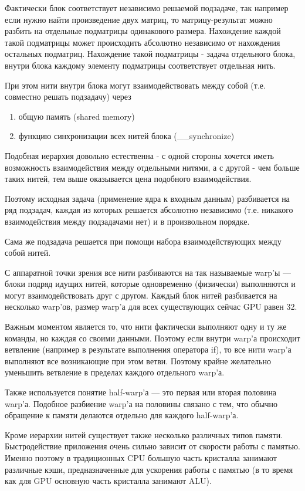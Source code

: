 Фактически блок соответствует независимо решаемой подзадаче, так например если нужно найти произведение двух матриц, то матрицу-результат можно разбить на отдельные подматрицы одинакового размера. Нахождение каждой такой подматрицы может происходить абсолютно независимо от нахождения остальных подматриц. Нахождение такой подматрицы - задача отдельного блока, внутри блока каждому элементу подматрицы соответствует отдельная нить.

При этом нити внутри блока могут взаимодействовать между собой (т.е. совместно решать подзадачу) через
\begin{enumerate}
\item общую память (shared memory)
\item функцию синхронизации всех нитей блока (\_\_synchronize)
\end{enumerate}

Подобная иерархия довольно естественна - с одной стороны хочется иметь возможность взаимодействия между отдельными нитями, а с другой - чем больше таких нитей, тем выше оказывается цена подобного взаимодействия.

Поэтому исходная задача (применение ядра к входным данным) разбивается на ряд подзадач, каждая из которых решается абсолютно независимо (т.е. никакого взаимодействия между подзадачами нет) и в произвольном порядке.

Сама же подзадача решается при помощи набора взаимодействующих между собой нитей.

С аппаратной точки зрения все нити разбиваются на так называемые warp'ы --- блоки подряд идущих нитей, которые одновременно (физически) выполняются и могут взаимодействовать друг с другом. Каждый блок нитей разбивается на несколько warp'ов, размер warp'а для всех существующих сейчас GPU равен 32.

Важным моментом является то, что нити фактически выполняют одну и ту же команды, но каждая со своими данными. Поэтому если внутри warp'а происходит ветвление (например в результате выполнения оператора if), то все нити warp'а выполняют все возникающие при этом ветви. Поэтому крайне желательно уменьшить ветвление в пределах каждого отдельного warp'а.

Также используется понятие half-warp'а --- это первая или вторая половина warp'а. Подобное разбиение warp'а на половины связано с тем, что обычно обращение к памяти делаются отдельно для каждого half-warp'а.

Кроме иерархии нитей существует также несколько различных типов памяти. Быстродействие приложения очень сильно зависит от скорости работы с памятью. Именно поэтому в традиционных CPU большую часть кристалла занимают различные кэши, предназначенные для ускорения работы с памятью (в то время как для GPU основную часть кристалла занимают ALU).

